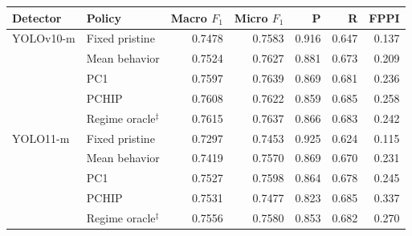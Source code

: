 \begin{tabular}{llrrrrr}
\toprule
Detector & Policy & Macro $F_1$ & Micro $F_1$ & P & R & FPPI \\
\midrule
YOLOv10-m & Fixed pristine & 0.7478 & 0.7583 & 0.916 & 0.647 & 0.137 \\
 & Mean behavior & 0.7524 & 0.7627 & 0.881 & 0.673 & 0.209 \\
 & PC1 & 0.7597 & 0.7639 & 0.869 & 0.681 & 0.236 \\
 & PCHIP & 0.7608 & 0.7622 & 0.859 & 0.685 & 0.258 \\
 & Regime oracle$^{\ddagger}$ & 0.7615 & 0.7637 & 0.866 & 0.683 & 0.242 \\
\midrule
YOLO11-m & Fixed pristine & 0.7297 & 0.7453 & 0.925 & 0.624 & 0.115 \\
 & Mean behavior & 0.7419 & 0.7570 & 0.869 & 0.670 & 0.231 \\
 & PC1 & 0.7527 & 0.7598 & 0.864 & 0.678 & 0.245 \\
 & PCHIP & 0.7531 & 0.7477 & 0.823 & 0.685 & 0.337 \\
 & Regime oracle$^{\ddagger}$ & 0.7556 & 0.7580 & 0.853 & 0.682 & 0.270 \\
\bottomrule
\end{tabular}
